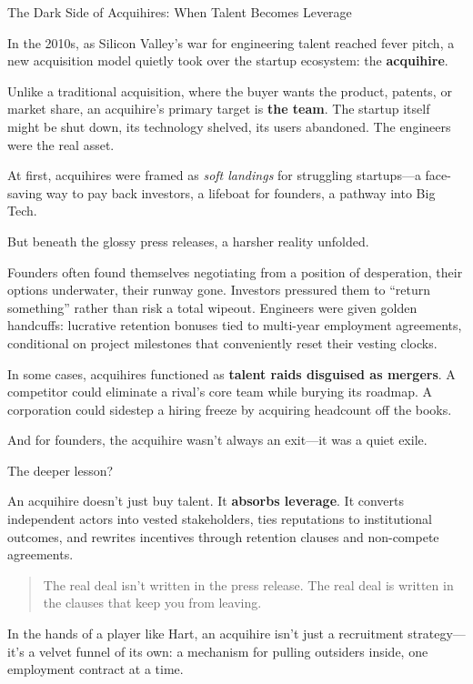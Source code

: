 \begin{HistoricalSidebar}{The Dark Side of Acquihires: When Talent Becomes Leverage}

  In the 2010s, as Silicon Valley’s war for engineering talent reached fever pitch, a new acquisition model quietly took over the startup ecosystem: the \textbf{acquihire}.

  \medskip
  
  Unlike a traditional acquisition, where the buyer wants the product, patents, or market share, an acquihire’s primary target is \textbf{the team}. The startup itself might be shut down, its technology shelved, its users abandoned. The engineers were the real asset.

  \medskip
  
  At first, acquihires were framed as \textit{soft landings} for struggling startups—a face-saving way to pay back investors, a lifeboat for founders, a pathway into Big Tech.

  \medskip
  
  But beneath the glossy press releases, a harsher reality unfolded.

  \medskip
  
  Founders often found themselves negotiating from a position of desperation, their options underwater, their runway gone. Investors pressured them to “return something” rather than risk a total wipeout. Engineers were given golden handcuffs: lucrative retention bonuses tied to multi-year employment agreements, conditional on project milestones that conveniently reset their vesting clocks.

  \medskip
  
  In some cases, acquihires functioned as \textbf{talent raids disguised as mergers}. A competitor could eliminate a rival’s core team while burying its roadmap. A corporation could sidestep a hiring freeze by acquiring headcount off the books.

  \medskip
  
  And for founders, the acquihire wasn’t always an exit—it was a quiet exile.
  
  \medskip
  
  The deeper lesson?

  \medskip
  
  An acquihire doesn’t just buy talent. It \textbf{absorbs leverage}. It converts independent actors into vested stakeholders, ties reputations to institutional outcomes, and rewrites incentives through retention clauses and non-compete agreements.
  
  \begin{quote}
  The real deal isn’t written in the press release.  
  The real deal is written in the clauses that keep you from leaving.
  \end{quote}
  
  In the hands of a player like Hart, an acquihire isn’t just a recruitment strategy—it’s a velvet funnel of its own:  
  a mechanism for pulling outsiders inside, one employment contract at a time.
\end{HistoricalSidebar}


